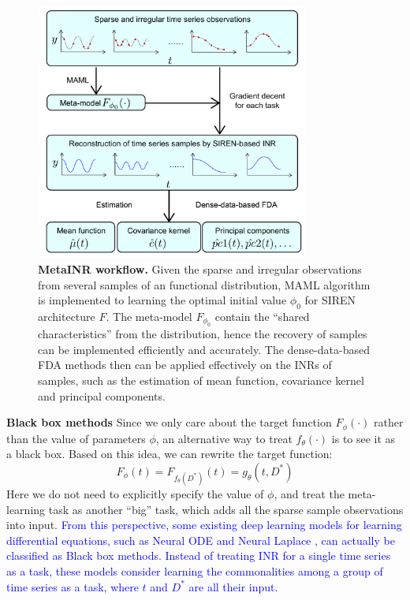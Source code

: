 \documentclass{article}
\begin{document}
\begin{figure}[tb]
  \centering
  \includegraphics[width=0.8\textwidth]{illustration.pdf}
  \caption{\textbf{MetaINR workflow.} Given the sparse and irregular observations from several samples of an functional distribution, MAML algorithm is implemented to learning the optimal initial value $\phi_0$ for SIREN architecture $F$. The meta-model $F_{\phi_0}$ contain the ``shared characteristics'' from the distribution, hence the recovery of samples can be implemented efficiently and accurately.
  The dense-data-based FDA methods then can be applied effectively on the INRs of samples, such as the estimation of mean function, covariance kernel and principal components.}
  \label{MetaINR workflow}
\end{figure}

\textbf{Black box methods}
Since we only care about the target function $F_\phi(\cdot)$ rather than the value of parameters $\phi$, an alternative way to treat $f_\theta(\cdot)$ is to see it as a black box. Based on this idea, we can rewrite the target function:
$$
F_\phi(t)=F_{f_\theta(D^*)}(t)=g_\theta(t,D^*)
$$
Here we do not need to explicitly specify the value of $\phi$, and treat the meta-learning task as another ``big'' task, which adds all the sparse sample observations into input.
\textcolor{blue}{
  From this perspective, some existing deep learning models for learning differential equations, 
  such as Neural ODE \cite{chen2018neural} and Neural Laplace \cite{holt2022neural}, 
  can actually be classified as Black box methods. 
  Instead of treating INR for a single time series as a task, 
  these models consider learning the commonalities among a group of time series as a task, where $t$ and $D^*$ are all their input.
}
\end{document}
